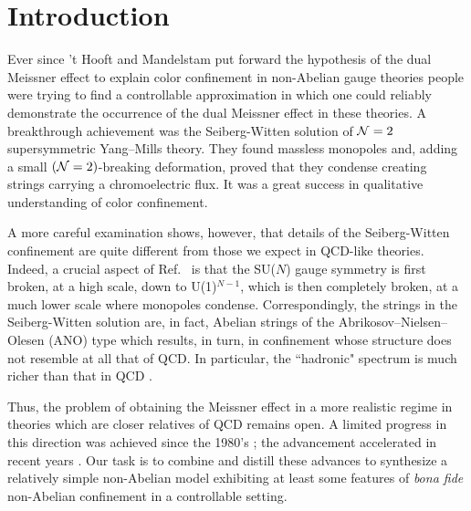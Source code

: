 \tableofcontents

\newpage
\section{Introduction}
\label{introd}

Ever since  't Hooft \cite{thooft}
and Mandelstam \cite{mandelstam}
put forward the hypothesis of the dual Meissner effect 
to explain color confinement in non-Abelian gauge
theories  people
were trying to find a controllable
approximation in which one could reliably demonstrate
the occurrence of the dual Meissner effect in these theories. 
A breakthrough achievement was the Seiberg-Witten
solution \cite{sw} of ${\cal N}=2$ supersymmetric 
Yang--Mills theory. They found massless monopoles and,
adding a small $({\cal N}=2)$-breaking deformation,
proved that they condense creating strings carrying 
a chromoelectric flux. It was a great success in qualitative
understanding of color confinement.

A more careful examination shows, however, that details of
the Seiberg-Witten confinement are quite different from 
those we expect in QCD-like theories. Indeed, a crucial aspect
of Ref.~\cite{sw} is  that the SU($N$)
gauge symmetry is first broken, at a high scale, down to U(1)$^{N-1}$,
which is then completely broken, at a much lower scale
where monopoles condense. Correspondingly,
the strings in the Seiberg-Witten
solution are, in fact, Abelian strings \cite{ANO}
of the Abrikosov--Nielsen--Olesen
(ANO) type which results, in turn, in confinement
whose structure does not resemble at all that of QCD. In particular, the
``hadronic" spectrum is much richer than that in QCD
\cite{DS,matt}.

Thus, the problem of obtaining the Meissner effect in a more realistic
regime in theories which are closer relatives of QCD
remains open. A limited progress in this direction
was achieved since the 1980's \cite{limited};
the advancement accelerated in recent years 
\cite{recent,Hanany,Auzzi,ShifmanYung,Tong,HananyTong,Markov}.
Our task is to combine and distill these advances
to synthesize a relatively simple non-Abelian model
exhibiting at least some features of {\em bona fide}
non-Abelian confinement in a controllable setting.

